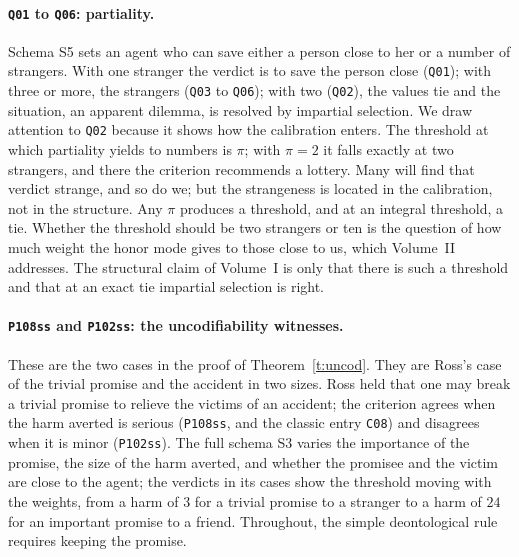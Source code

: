 \documentclass{situationist-preprint}
\begin{document}
\paragraph{\texttt{Q01} to \texttt{Q06}: partiality.} Schema S5 sets an agent who can save either a person close to her or a number of strangers. With one stranger the verdict is to save the person close (\texttt{Q01}); with three or more, the strangers (\texttt{Q03} to \texttt{Q06}); with two (\texttt{Q02}), the values tie and the situation, an apparent dilemma, is resolved by impartial selection. We draw attention to \texttt{Q02} because it shows how the calibration enters. The threshold at which partiality yields to numbers is $\pi$; with $\pi=2$ it falls exactly at two strangers, and there the criterion recommends a lottery. Many will find that verdict strange, and so do we; but the strangeness is located in the calibration, not in the structure. Any $\pi$ produces a threshold, and at an integral threshold, a tie. Whether the threshold should be two strangers or ten is the question of how much weight the honor mode gives to those close to us, which Volume~II addresses. The structural claim of Volume~I is only that there is such a threshold and that at an exact tie impartial selection is right.

\paragraph{\texttt{P108ss} and \texttt{P102ss}: the uncodifiability witnesses.} These are the two cases in the proof of Theorem~\ref{t:uncod}. They are Ross's case of the trivial promise and the accident \citep[ch.~2]{Ross1930} in two sizes. Ross held that one may break a trivial promise to relieve the victims of an accident; the criterion agrees when the harm averted is serious (\texttt{P108ss}, and the classic entry \texttt{C08}) and disagrees when it is minor (\texttt{P102ss}). The full schema S3 varies the importance of the promise, the size of the harm averted, and whether the promisee and the victim are close to the agent; the verdicts in its \stnschthree{} cases show the threshold moving with the weights, from a harm of $3$ for a trivial promise to a stranger to a harm of $24$ for an important promise to a friend. Throughout, the simple deontological rule requires keeping the promise.
\end{document}
